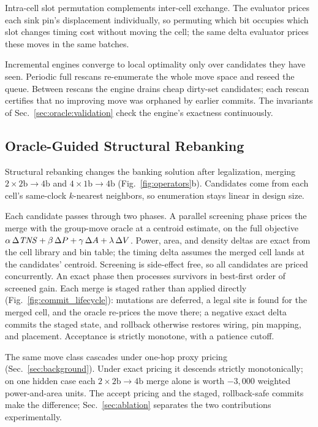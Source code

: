 Intra-cell slot permutation complements inter-cell exchange. The evaluator prices each sink pin's displacement individually, so permuting which bit occupies which slot changes timing cost without moving the cell; the same delta evaluator prices these moves in the same batches.

Incremental engines converge to local optimality only over candidates they have seen. Periodic full rescans re-enumerate the whole move space and reseed the queue. Between rescans the engine drains cheap dirty-set candidates; each rescan certifies that no improving move was orphaned by earlier commits. The invariants of Sec.~\ref{sec:oracle:validation} check the engine's exactness continuously.

\subsection{Oracle-Guided Structural Rebanking}\label{sec:rebank}

Structural rebanking changes the banking solution after legalization, merging $2{\times}2\mathrm{b}{\to}4\mathrm{b}$ and $4{\times}1\mathrm{b}{\to}4\mathrm{b}$ (Fig.~\ref{fig:operators}b). Candidates come from each cell's same-clock $k$-nearest neighbors, so enumeration stays linear in design size.

Each candidate passes through two phases. A parallel screening phase prices the merge with the group-move oracle at a centroid estimate, on the full objective $\alpha\,\Delta\mathit{TNS} + \beta\,\Delta P + \gamma\,\Delta A + \lambda\,\Delta V$. Power, area, and density deltas are exact from the cell library and bin table; the timing delta assumes the merged cell lands at the candidates' centroid. Screening is side-effect free, so all candidates are priced concurrently. An exact phase then processes survivors in best-first order of screened gain. Each merge is staged rather than applied directly (Fig.~\ref{fig:commit_lifecycle}): mutations are deferred, a legal site is found for the merged cell, and the oracle re-prices the move there; a negative exact delta commits the staged state, and rollback otherwise restores wiring, pin mapping, and placement. Acceptance is strictly monotone, with a patience cutoff.

The same move class cascades under one-hop proxy pricing (Sec.~\ref{sec:background}). Under exact pricing it descends strictly monotonically; on one hidden case each $2{\times}2\mathrm{b}{\to}4\mathrm{b}$ merge alone is worth $-3{,}000$ weighted power-and-area units. The accept pricing and the staged, rollback-safe commits make the difference; Sec.~\ref{sec:ablation} separates the two contributions experimentally.

